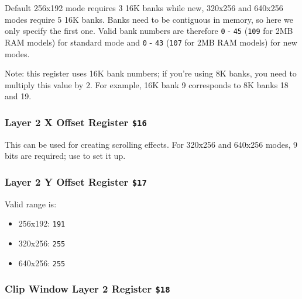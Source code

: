 Default 256x192 mode requires 3 16K banks while new, 320x256 and 640x256 modes require 5 16K banks. Banks need to be contiguous in memory, so here we only specify the first one. Valid bank numbers are therefore {\tt 0} - {\tt 45} ({\tt 109} for 2MB RAM models) for standard mode and {\tt 0} - {\tt 43} ({\tt 107} for 2MB RAM models) for new modes.

Note: this register uses 16K bank numbers; if you're using 8K banks, you need to multiply this value by 2. For example, 16K bank 9 corresponds to 8K banks 18 and 19.


\pagebreak
\subsubsection{Layer 2 X Offset Register {\tt \$16}}

\begin{NextPort}
\end{NextPort}

This can be used for creating scrolling effects. For 320x256 and 640x256 modes, 9 bits are required; use  to set it up.


\subsubsection{Layer 2 Y Offset Register {\tt \$17}}

\begin{NextPort}
\end{NextPort}

Valid range is:

\begin{itemize}[topsep=1pt,itemsep=1pt]
    \item 256x192: {\tt 191}
    \item 320x256: {\tt 255}
    \item 640x256: {\tt 255}
\end{itemize}


\subsubsection{Clip Window Layer 2 Register {\tt \$18}}

\begin{NextPort}
\end{NextPort}

